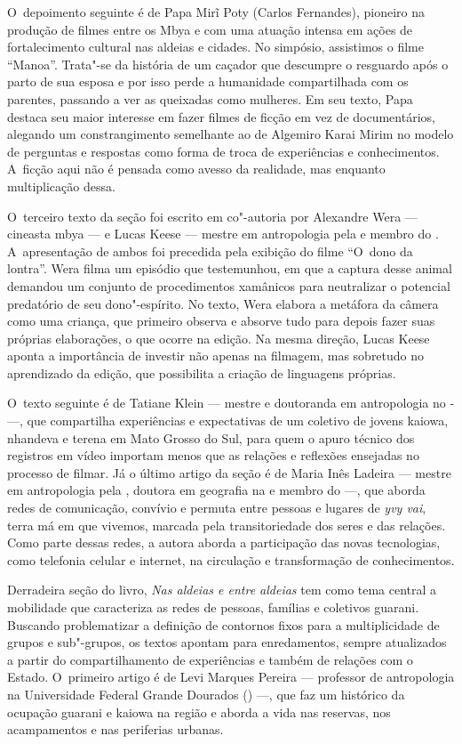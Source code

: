 O~depoimento seguinte é de Papa Mirĩ Poty (Carlos
Fernandes), pioneiro na produção de filmes entre os Mbya e com uma
atuação intensa em ações de fortalecimento cultural nas aldeias e
cidades. No simpósio, assistimos o filme ``Manoa''. Trata"-se da história
de um caçador que descumpre o resguardo após o parto de sua esposa e
por isso perde a humanidade compartilhada com os parentes, passando a
ver as queixadas como mulheres. Em seu texto, Papa destaca seu maior
interesse em fazer filmes de ficção em vez de documentários, alegando
um constrangimento semelhante ao de Algemiro Karai Mirim no modelo de
perguntas e respostas como forma de troca de experiências e
conhecimentos. A~ficção aqui não é pensada como avesso da realidade,
mas enquanto multiplicação dessa. 

O~terceiro texto da seção foi escrito em co"-autoria por Alexandre Wera ---
cineasta mbya --- e Lucas Keese --- mestre em antropologia pela  e
membro do . A~apresentação de ambos foi precedida pela exibição do
filme ``O~dono da lontra''. Wera filma um episódio que testemunhou, em
que a captura desse animal demandou um conjunto de procedimentos
xamânicos para neutralizar o potencial predatório de seu dono"-espírito.
No texto, Wera elabora a metáfora da câmera como uma criança, que
primeiro observa e absorve tudo para depois fazer suas próprias
elaborações, o que ocorre na edição. Na mesma direção, Lucas Keese
aponta a importância de investir não apenas na filmagem, mas sobretudo
no aprendizado da edição, que possibilita a criação de linguagens
próprias. 

O~texto seguinte é de Tatiane Klein --- mestre e doutoranda em
antropologia no - ---, que compartilha experiências e
expectativas de um coletivo de jovens kaiowa, nhandeva e terena em Mato
Grosso do Sul, para quem o apuro técnico dos registros em vídeo
importam menos que as relações e reflexões ensejadas no processo de
filmar. Já o último artigo da seção é de Maria Inês Ladeira --- mestre em
antropologia pela , doutora em geografia na  e membro do  ---,
que aborda redes de comunicação, convívio e permuta entre pessoas e
lugares de \emph{yvy vai}, terra má em que vivemos, marcada pela
transitoriedade dos seres e das relações. Como parte dessas redes, a
autora aborda a participação das novas tecnologias, como telefonia
celular e internet, na circulação e transformação de conhecimentos.

Derradeira seção do livro, \emph{Nas aldeias e entre aldeias} tem como tema
central a mobilidade que caracteriza as redes de pessoas, famílias e
coletivos guarani. Buscando problematizar a definição de contornos
fixos para a multiplicidade de grupos e sub"-grupos, os textos apontam
para enredamentos, sempre atualizados a partir do compartilhamento de
experiências e também de relações com o Estado. O~primeiro artigo é de
Levi Marques Pereira --- professor de antropologia na Universidade
Federal Grande Dourados () ---, que faz um histórico da ocupação
guarani e kaiowa na região e aborda a vida nas reservas, nos
acampamentos e nas periferias urbanas. 

